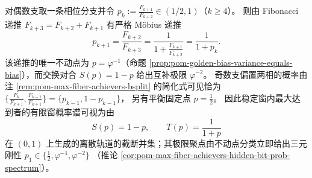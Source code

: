 \begin{remark}\label{rem:pom-max-fiber-prob-spectrum-mobius-closure}
对偶数支取一条相位分支并令
\(
p_k:=\frac{F_{k+1}}{F_{k+2}}\in(1/2,1)
\)（\(k\ge 4\)）。
则由 Fibonacci 递推 \(F_{k+3}=F_{k+2}+F_{k+1}\) 有严格 Möbius 递推
\[
\boxed{\;
p_{k+1}=\frac{F_{k+2}}{F_{k+3}}=\frac{1}{1+\frac{F_{k+1}}{F_{k+2}}}=\frac{1}{1+p_k}.\;}
\]
该递推的唯一不动点为 \(p=\varphi^{-1}\)（命题 \ref{prop:pom-golden-bias-variance-equals-bias}），而交换对合 \(S(p)=1-p\) 给出互补极限 \(\varphi^{-2}\)。
奇数支偏置两相的概率由注 \ref{rem:pom-max-fiber-achievers-bsplit} 的简化式可见恰为
\(
\{\frac{F_k}{F_{k+1}},\frac{F_{k-1}}{F_{k+1}}\}=\{p_{k-1},1-p_{k-1}\}
\)，
另有平衡固定点 \(p=\tfrac12\)。
因此稳定窗内最大达到者的有限窗概率谱可视为由
\[
S(p)=1-p,\qquad T(p)=\frac{1}{1+p}
\]
在 \((0,1)\) 上生成的离散轨道的截断并集；其极限聚点由不动点分类立即给出三元刚性
\(
p_1\in\{\tfrac12,\varphi^{-1},\varphi^{-2}\}
\)
（推论 \ref{cor:pom-max-fiber-achievers-hidden-bit-prob-spectrum}）。
\end{remark}

\endinput
